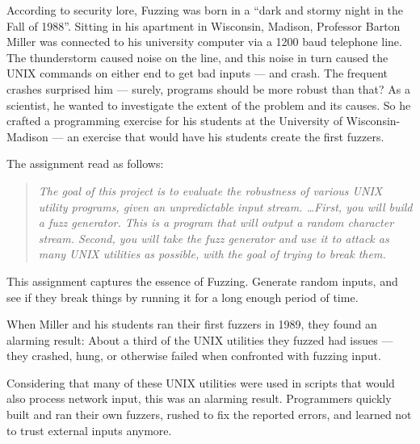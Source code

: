 According to security lore, Fuzzing was born in a ``dark and stormy night in the
Fall of 1988''. Sitting in his apartment in Wisconsin, Madison, Professor Barton
Miller was connected to his university computer via a 1200 baud telephone line.
The thunderstorm caused noise on the line, and this noise in turn caused the
UNIX commands on either end to get bad inputs --- and crash. The frequent crashes
surprised him --- surely, programs should be more robust than that? As a
scientist, he wanted to investigate the extent of the problem and its causes. So
he crafted a programming exercise for his students at the University of
Wisconsin-Madison --- an exercise that would have his students create the first
fuzzers.

The assignment read as follows:

\begin{quote}
    {\it The goal of this project is to evaluate the robustness of various UNIX
    utility programs, given an unpredictable input stream. \dots First, you will
    build a fuzz generator. This is a program that will output a random character
    stream. Second, you will take the fuzz generator and use it to attack as many
    UNIX utilities as possible, with the goal of trying to break them.}
\end{quote}

This assignment captures the essence of Fuzzing. Generate random inputs, and see
if they break things by running it for a long enough period of time.

When Miller and his students ran their first fuzzers in 1989, they found an
alarming result: About a third of the UNIX utilities they fuzzed had issues ---
they crashed, hung, or otherwise failed when confronted with fuzzing input.

Considering that many of these UNIX utilities were used in scripts that would
also process network input, this was an alarming result. Programmers quickly
built and ran their own fuzzers, rushed to fix the reported errors, and learned
not to trust external inputs anymore.
%






